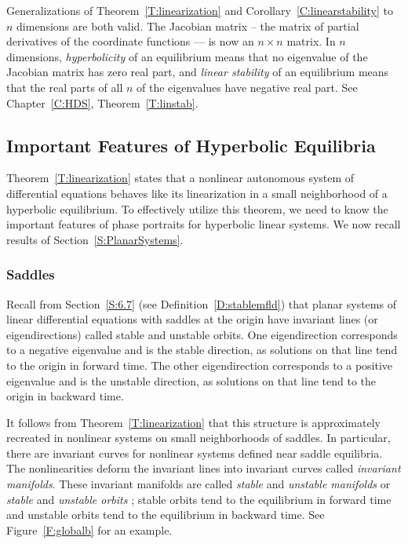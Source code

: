 \documentclass{ximera}
\begin{document}
\begin{remark} 
Generalizations of Theorem~\ref{T:linearization} and 
Corollary~\ref{C:linearstability} to $n$ dimensions are both valid. 
{\rm The Jacobian matrix -- the matrix of partial 
derivatives of the coordinate functions --- is now an $n\times n$
matrix.  In $n$ dimensions, {\em hyperbolicity\/} 
of an equilibrium means that no eigenvalue of the Jacobian matrix has 
zero real part, and {\em linear stability\/} of an equilibrium means 
that the real parts of all $n$ of the eigenvalues have negative real 
part.  See Chapter~\ref{C:HDS}, Theorem~\ref{T:linstab}.}
\end{remark}  

\subsection*{Important Features of Hyperbolic Equilibria}

Theorem~\ref{T:linearization} states that a nonlinear autonomous
system of differential equations behaves like its linearization 
in a small neighborhood of a hyperbolic equilibrium.  To effectively
utilize this theorem, we need to know the important features of phase 
portraits for hyperbolic linear systems.  We now recall results of 
Section~\ref{S:PlanarSystems}.

\subsubsection*{Saddles}  

Recall from Section~\ref{S:6.7} (see Definition~\ref{D:stablemfld})
that planar systems of linear differential equations with saddles at the 
origin have invariant lines (or eigendirections) called stable and unstable 
orbits.  One eigendirection corresponds to a negative eigenvalue and is 
the stable direction, as solutions on that line 
tend to the origin in forward time.
The other eigendirection corresponds to a positive eigenvalue 
and is the unstable direction, as solutions on 
that line tend to the origin in backward time.

It follows from Theorem~\ref{T:linearization} that this structure is
approximately recreated in nonlinear systems on small neighborhoods of
saddles.  In particular, there are invariant curves for nonlinear systems 
defined near saddle equilibria.  The nonlinearities deform the invariant 
lines into invariant curves called {\em invariant manifolds\/}.  
   These invariant manifolds 
are called {\em stable\/} and {\em unstable manifolds\/} or {\em stable\/} 
and {\em unstable orbits\/} ; 
stable orbits tend to the equilibrium in forward 
time and unstable orbits tend to the equilibrium in backward time.  See 
Figure~\ref{F:globalb} for an example. 
\end{document}
